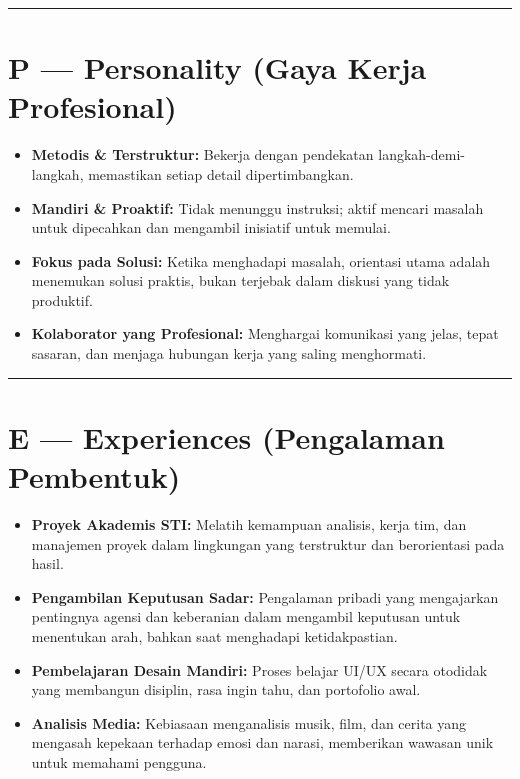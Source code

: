 \documentclass[
  letterpaper,
  DIV=11,
  numbers=noendperiod]{scrreprt}
\providecommand{\tightlist}{%
  \setlength{\itemsep}{0pt}\setlength{\parskip}{0pt}}
\begin{document}
\begin{center}\rule{0.5\linewidth}{0.5pt}\end{center}

\section{P --- Personality (Gaya Kerja
Profesional)}\label{p-personality-gaya-kerja-profesional}

\begin{itemize}
\tightlist
\item
  \textbf{Metodis \& Terstruktur:} Bekerja dengan pendekatan
  langkah-demi-langkah, memastikan setiap detail dipertimbangkan.
\item
  \textbf{Mandiri \& Proaktif:} Tidak menunggu instruksi; aktif mencari
  masalah untuk dipecahkan dan mengambil inisiatif untuk memulai.
\item
  \textbf{Fokus pada Solusi:} Ketika menghadapi masalah, orientasi utama
  adalah menemukan solusi praktis, bukan terjebak dalam diskusi yang
  tidak produktif.
\item
  \textbf{Kolaborator yang Profesional:} Menghargai komunikasi yang
  jelas, tepat sasaran, dan menjaga hubungan kerja yang saling
  menghormati.
\end{itemize}

\begin{center}\rule{0.5\linewidth}{0.5pt}\end{center}

\section{E --- Experiences (Pengalaman
Pembentuk)}\label{e-experiences-pengalaman-pembentuk}

\begin{itemize}
\tightlist
\item
  \textbf{Proyek Akademis STI:} Melatih kemampuan analisis, kerja tim,
  dan manajemen proyek dalam lingkungan yang terstruktur dan
  berorientasi pada hasil.
\item
  \textbf{Pengambilan Keputusan Sadar:} Pengalaman pribadi yang
  mengajarkan pentingnya agensi dan keberanian dalam mengambil keputusan
  untuk menentukan arah, bahkan saat menghadapi ketidakpastian.
\item
  \textbf{Pembelajaran Desain Mandiri:} Proses belajar UI/UX secara
  otodidak yang membangun disiplin, rasa ingin tahu, dan portofolio
  awal.
\item
  \textbf{Analisis Media:} Kebiasaan menganalisis musik, film, dan
  cerita yang mengasah kepekaan terhadap emosi dan narasi, memberikan
  wawasan unik untuk memahami pengguna.
\end{itemize}
\end{document}
